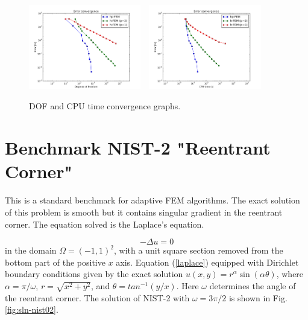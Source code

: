\documentclass[12pt]{elsarticle}
\begin{document}
\begin{figure}[H]
\centering
\includegraphics[height=3.7cm]{nist/nist-1/conv_dof_aniso.png}\ \
\includegraphics[height=3.7cm]{nist/nist-1/conv_cpu_aniso.png}
\vspace{-5mm}
\caption{DOF and CPU time convergence graphs.}
\vspace{-5mm}
\label{fig:nist-1-conv}
\end{figure}


\section{Benchmark NIST-2 "Reentrant Corner"}
\label{sec:bench-2}

This is a standard benchmark for adaptive FEM algorithms.
The exact solution of this problem is smooth but it contains
singular gradient in the reentrant corner.
The equation solved is the Laplace's equation.

\begin{equation} \label{laplace}
-\Delta u = 0
\end{equation}
in the domain $\Omega = (-1, 1)^2$, with a unit square
section removed from the bottom part of the positive $x$ axis.
Equation (\ref{laplace}) equipped with Dirichlet
boundary conditions given by the exact solution
$u(x, y) = r^{\alpha}\sin(\alpha \theta)$,
where $\alpha = \pi / \omega$, $r = \sqrt{x^2+y^2}$,
and $\theta = tan^{-1}(y/x)$. Here $\omega $ determines
the angle of the reentrant corner.
The solution of NIST-2 with $\omega = 3 \pi / 2$
is shown in Fig. \ref{fig:sln-nist02}.
\end{document}
